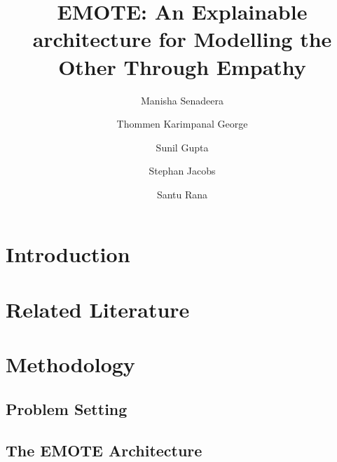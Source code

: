 \documentclass[runningheads,table]{llncs}
\begin{document}
%
\title{EMOTE: An Explainable architecture for Modelling the Other Through Empathy}
%
%
\author{Manisha Senadeera \and
Thommen Karimpanal George \and
Sunil Gupta \and
Stephan Jacobs \and
Santu Rana}
%

%


%
\maketitle              %
%
\begin{abstract}


\end{abstract}
%
%
%

\section{Introduction}


\section{Related Literature}


\section{Methodology}\label{sec:method}

\subsection{Problem Setting}\label{sec:problem}


\subsection{The EMOTE Architecture}\label{sec:emp-arch}

\end{document}
